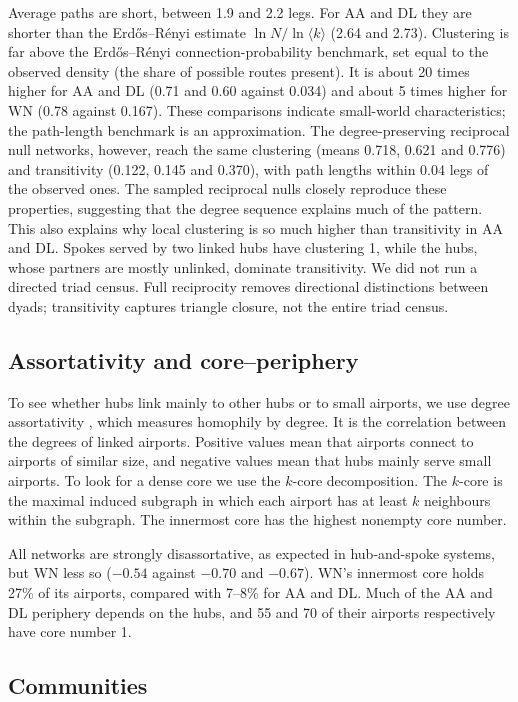 \documentclass[12pt, a4paper]{article}
\begin{document}
Average paths are short, between 1.9 and 2.2 legs. For AA and DL they are shorter than
the Erd\H{o}s--R\'enyi estimate $\ln N/\ln\langle k\rangle$ (2.64 and 2.73).
Clustering is far above the Erd\H{o}s--R\'enyi connection-probability benchmark, set equal to the observed density (the share of possible routes present). It is about
20 times higher for AA and DL (0.71 and 0.60 against 0.034) and about 5 times higher
for WN (0.78 against 0.167). These comparisons indicate small-world characteristics; the path-length benchmark is an approximation. The
degree-preserving reciprocal null networks, however, reach the same clustering (means
0.718, 0.621 and 0.776) and transitivity (0.122, 0.145 and 0.370), with path lengths
within 0.04 legs of the observed ones. The sampled reciprocal nulls closely reproduce these properties, suggesting that the degree sequence explains much of the pattern. This also explains why local clustering is so much higher
than transitivity in AA and DL. Spokes served by two linked hubs have clustering 1,
while the hubs, whose partners are mostly unlinked, dominate transitivity. We did not run a directed triad census. Full reciprocity removes directional distinctions between dyads; transitivity captures triangle closure, not the entire triad census.

\subsection{Assortativity and core--periphery}

To see whether hubs link mainly to other hubs or to small airports, we use degree
assortativity \cite{newman2002}, which measures homophily by
degree. It is the correlation between the degrees of linked airports. Positive values
mean that airports connect to airports of similar size, and negative values mean that
hubs mainly serve small airports. To look for a dense core we use the $k$-core decomposition.
The $k$-core is the maximal induced subgraph in which each airport has at least $k$ neighbours within the subgraph. The innermost core has the highest nonempty core number.

All networks are strongly disassortative, as expected in hub-and-spoke systems, but WN
less so ($-0.54$ against $-0.70$ and $-0.67$). WN's innermost core holds 27\% of its
airports, compared with 7--8\% for AA and DL. Much of the AA and DL periphery depends
on the hubs, and 55 and 70 of their airports respectively have core number 1.

\subsection{Communities}
\end{document}
